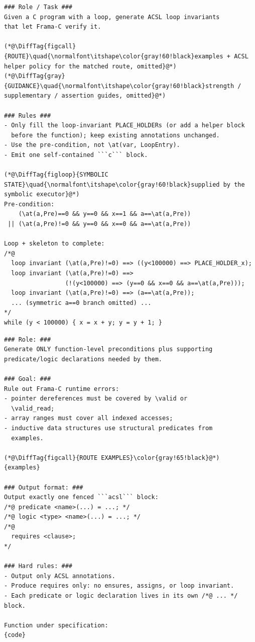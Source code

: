 \begin{tcolorbox}[promptboxcompact, title={Loop-invariant generation prompt}]
\begin{lstlisting}[style=PromptInnerCompact]
### Role / Task ###
Given a C program with a loop, generate ACSL loop invariants
that let Frama-C verify it.

(*@\DiffTag{figcall}{ROUTE}\quad{\normalfont\itshape\color{gray!60!black}examples + ACSL helper policy for the matched route, omitted}@*)
(*@\DiffTag{gray}{GUIDANCE}\quad{\normalfont\itshape\color{gray!60!black}strength / supplementary / assertion guides, omitted}@*)

### Rules ###
- Only fill the loop-invariant PLACE_HOLDERs (or add a helper block
  before the function); keep existing annotations unchanged.
- Use the pre-condition, not \at(var, LoopEntry).
- Emit one self-contained ```c``` block.

(*@\DiffTag{figloop}{SYMBOLIC STATE}\quad{\normalfont\itshape\color{gray!60!black}supplied by the symbolic executor}@*)
Pre-condition:
    (\at(a,Pre)==0 && y==0 && x==1 && a==\at(a,Pre))
 || (\at(a,Pre)!=0 && y==0 && x==0 && a==\at(a,Pre))

Loop + skeleton to complete:
/*@
  loop invariant (\at(a,Pre)!=0) ==> ((y<100000) ==> PLACE_HOLDER_x);
  loop invariant (\at(a,Pre)!=0) ==>
                 (!(y<100000) ==> (y==0 && x==0 && a==\at(a,Pre)));
  loop invariant (\at(a,Pre)!=0) ==> (a==\at(a,Pre));
  ... (symmetric a==0 branch omitted) ...
*/
while (y < 100000) { x = x + y; y = y + 1; }
\end{lstlisting}
\end{tcolorbox}


\begin{tcolorbox}[promptboxcompact, title={Precondition fallback prompt}]
\begin{lstlisting}[style=PromptInnerCompact]
### Role: ###
Generate ONLY function-level preconditions plus supporting
predicate/logic declarations needed by them.

### Goal: ###
Rule out Frama-C runtime errors:
- pointer dereferences must be covered by \valid or
  \valid_read;
- array ranges must cover all indexed accesses;
- inductive data structures use structural predicates from
  examples.

(*@\DiffTag{figcall}{ROUTE EXAMPLES}\color{gray!65!black}@*)
{examples}

### Output format: ###
Output exactly one fenced ```acsl``` block:
/*@ predicate <name>(...) = ...; */
/*@ logic <type> <name>(...) = ...; */
/*@
  requires <clause>;
*/

### Hard rules: ###
- Output only ACSL annotations.
- Produce requires only: no ensures, assigns, or loop invariant.
- Each predicate or logic declaration lives in its own /*@ ... */ block.

Function under specification:
{code}
\end{lstlisting}
\end{tcolorbox}

